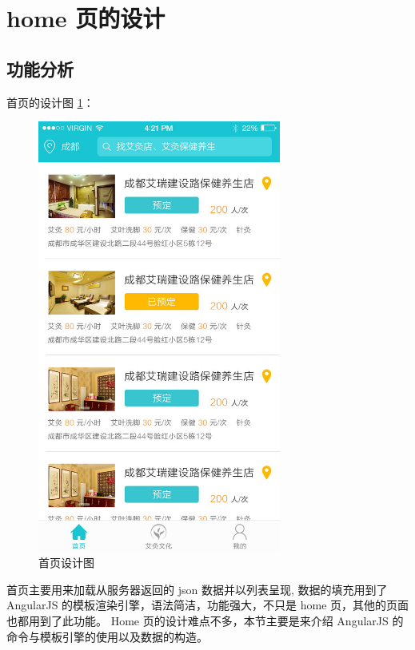
\section{home 页的设计}
  \label{sec:home_页的设计}
    \subsection{功能分析}
      \label{subsec:功能分析}
        首页的设计图 \ref{fig:home}：
        \begin{figure}[H]
          \centering
          \includegraphics[width=8cm]{img/201705181050.jpg}
          \caption{首页设计图}
          \label{fig:home}
        \end{figure}
        首页主要用来加载从服务器返回的 json 数据并以列表呈现, 数据的填充用到了 AngularJS 的模板渲染引擎，语法简洁，功能强大，不只是 home 页，其他的页面也都用到了此功能。 Home 页的设计难点不多，本节主要是来介绍 AngularJS 的命令与模板引擎的使用以及数据的构造。

